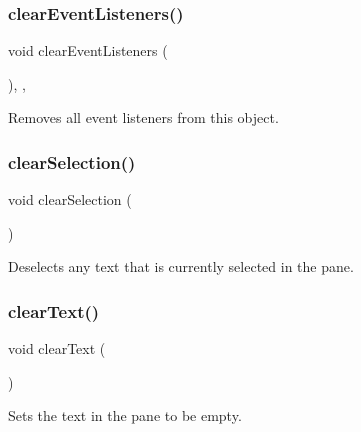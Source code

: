 \subsubsection{\texorpdfstring{clear\+Event\+Listeners()}{clearEventListeners()}}
{\footnotesize\ttfamily void clear\+Event\+Listeners (\begin{DoxyParamCaption}{ }\end{DoxyParamCaption})\hspace{0.3cm}{\ttfamily [protected]}, {\ttfamily [virtual]}, {\ttfamily [inherited]}}



Removes all event listeners from this object. 

\mbox{\label{classGBrowserPane_abd07e172ccec6823a88289c21124a367}} 
\subsubsection{\texorpdfstring{clear\+Selection()}{clearSelection()}}
{\footnotesize\ttfamily void clear\+Selection (\begin{DoxyParamCaption}{ }\end{DoxyParamCaption})\hspace{0.3cm}{\ttfamily [virtual]}}



Deselects any text that is currently selected in the pane. 

\mbox{\label{classGBrowserPane_a25f53c7d92eb2a5197cd4418c0165367}} 
\subsubsection{\texorpdfstring{clear\+Text()}{clearText()}}
{\footnotesize\ttfamily void clear\+Text (\begin{DoxyParamCaption}{ }\end{DoxyParamCaption})\hspace{0.3cm}{\ttfamily [virtual]}}



Sets the text in the pane to be empty. 

\mbox{\label{classGObservable_a284f31528c0520f8e545c03ac9eeac74}} 
